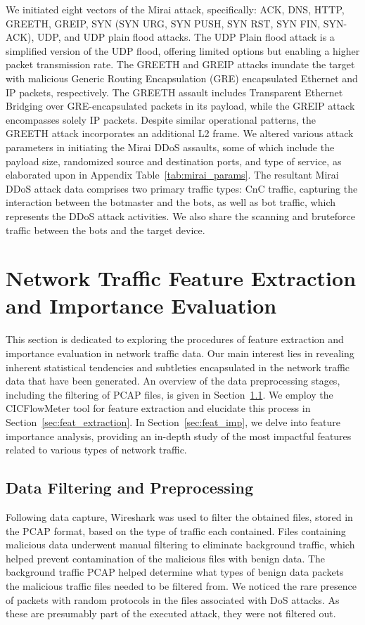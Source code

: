 \documentclass[lettersize,journal]{IEEEtran}
\begin{document}
We initiated eight vectors of the Mirai attack, specifically: ACK, \ac{DNS}, HTTP, GREETH, GREIP, SYN (SYN URG, SYN PUSH, SYN RST, SYN FIN, SYN-ACK), UDP, and UDP plain flood attacks. The UDP Plain flood attack is a simplified version of the \ac{UDP} flood, offering limited options but enabling a higher packet transmission rate. The GREETH and GREIP attacks inundate the target with malicious Generic Routing Encapsulation (GRE) encapsulated Ethernet and \ac{IP} packets, respectively. The GREETH assault includes Transparent Ethernet Bridging over GRE-encapsulated packets in its payload, while the GREIP attack encompasses solely \ac{IP} packets. Despite similar operational patterns, the GREETH attack incorporates an additional L2 frame. We altered various attack parameters in initiating the Mirai \ac{DDoS} assaults, some of which include the payload size, randomized source and destination ports, and type of service, as elaborated upon in Appendix Table~\ref{tab:mirai_params}. The resultant Mirai \ac{DDoS} attack data comprises two primary traffic types: \ac{CnC} traffic, capturing the interaction between the botmaster and the bots, as well as bot traffic, which represents the \ac{DDoS} attack activities. We also share the scanning and bruteforce traffic between the bots and the target device. 

\section{Network Traffic Feature Extraction and Importance Evaluation} \label{sec:feat_engineering}
This section is dedicated to exploring the procedures of feature extraction and importance evaluation in network traffic data. Our main interest lies in revealing inherent statistical tendencies and subtleties encapsulated in the network traffic data that have been generated. An overview of the data preprocessing stages, including the filtering of \ac{PCAP} files, is given in Section~\ref{sec:preprocessing}. We employ the CICFlowMeter tool for feature extraction and elucidate this process in Section~\ref{sec:feat_extraction}. In Section~\ref{sec:feat_imp}, we delve into feature importance analysis, providing an in-depth study of the most impactful features related to various types of network traffic.

\subsection{Data Filtering and Preprocessing}\label{sec:preprocessing}
 Following data capture, Wireshark was used to filter the obtained files, stored in the \ac{PCAP} format, based on the type of traffic each contained. Files containing malicious data underwent manual filtering to eliminate background traffic, which helped prevent contamination of the malicious files with benign data. The background traffic \ac{PCAP} helped determine what types of benign data packets the malicious traffic files needed to be filtered from. We noticed the rare presence of packets with random protocols in the files associated with \ac{DoS} attacks. As these are presumably part of the executed attack, they were not filtered out.
\end{document}
